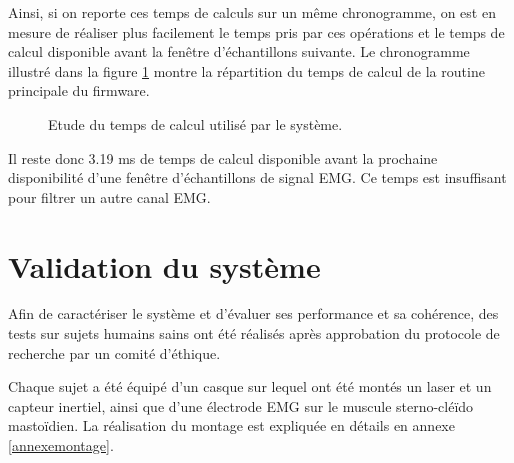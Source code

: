 \documentclass[letterpaper, twoside, 12pt, memoire, creativecommons, hyperref]{thETS}
\begin{document}
Ainsi, si on reporte ces temps de calculs sur un même chronogramme, on est en mesure de réaliser plus facilement le temps pris par ces opérations et le temps de calcul disponible avant la fenêtre d'échantillons suivante. Le chronogramme illustré dans la figure \ref{fig:chronogrammeDisc} montre la répartition du temps de calcul de la routine principale du firmware. 

\begin{figure}
	\centering
	\caption{Etude du temps de calcul utilisé par le système.}
	\label{fig:chronogrammeDisc}
\end{figure}

Il reste donc 3.19 ms de temps de calcul disponible avant la prochaine disponibilité d'une fenêtre d'échantillons de signal EMG. Ce temps est insuffisant pour filtrer un autre canal EMG.

\section{Validation du système}

Afin de caractériser le système et d'évaluer ses performance et sa cohérence, des tests sur sujets humains sains ont été réalisés après approbation du protocole de recherche par un comité d'éthique. 

Chaque sujet a été équipé d'un casque sur lequel ont été montés un laser et un capteur inertiel, ainsi que d'une électrode EMG sur le muscule sterno-cléïdo mastoïdien. La réalisation du montage est expliquée en détails en annexe \ref{annexemontage}.
\end{document}
